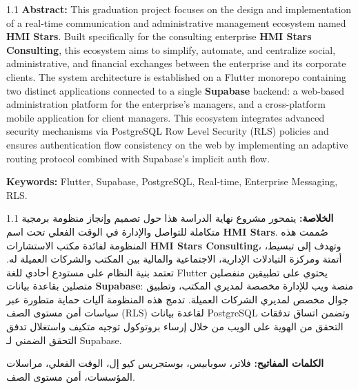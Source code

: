 \begin{spacing}{1.1}
\noindent \textbf{Abstract: } 
This graduation project focuses on the design and implementation of a real-time communication and administrative management ecosystem named \textbf{HMI Stars}. Built specifically for the consulting enterprise \textbf{HMI Stars Consulting}, this ecosystem aims to simplify, automate, and centralize social, administrative, and financial exchanges between the enterprise and its corporate clients. The system architecture is established on a Flutter monorepo containing two distinct applications connected to a single \textbf{Supabase} backend: a web-based administration platform for the enterprise's managers, and a cross-platform mobile application for client managers. This ecosystem integrates advanced security mechanisms via PostgreSQL Row Level Security (RLS) policies and ensures authentication flow consistency on the web by implementing an adaptive routing protocol combined with Supabase's implicit auth flow.

\noindent \textbf{Keywords: } Flutter, Supabase, PostgreSQL, Real-time, Enterprise Messaging, RLS.
\end{spacing}

\vspace{0.6cm}

\begin{otherlanguage}{arabic}
\begin{spacing}{1.1}
\noindent \textbf{الخلاصة: } 
يتمحور مشروع نهاية الدراسة هذا حول تصميم وإنجاز منظومة برمجية متكاملة للتواصل والإدارة في الوقت الفعلي تحت اسم \textbf{HMI Stars}. صُممت هذه المنظومة لفائدة مكتب الاستشارات \textbf{HMI Stars Consulting}، وتهدف إلى تبسيط، أتمتة ومركزة التبادلات الإدارية، الاجتماعية والمالية بين المكتب والشركات العميلة له. تعتمد بنية النظام على مستودع أحادي للغة Flutter يحتوي على تطبيقين منفصلين متصلين بقاعدة بيانات \textbf{Supabase}: منصة ويب للإدارة مخصصة لمديري المكتب، وتطبيق جوال مخصص لمديري الشركات العميلة. تدمج هذه المنظومة آليات حماية متطورة عبر سياسات أمن مستوى الصف (RLS) لقاعدة بيانات PostgreSQL وتضمن اتساق تدفقات التحقق من الهوية على الويب من خلال إرساء بروتوكول توجيه متكيف واستغلال تدفق التحقق الضمني لـ Supabase.

\noindent \textbf{الكلمات المفاتيح: } فلاتر، سوبابيس، بوستجريس كيو إل، الوقت الفعلي، مراسلات المؤسسات، أمن مستوى الصف.
\end{spacing}
\end{otherlanguage}
\vspace*{\fill}
